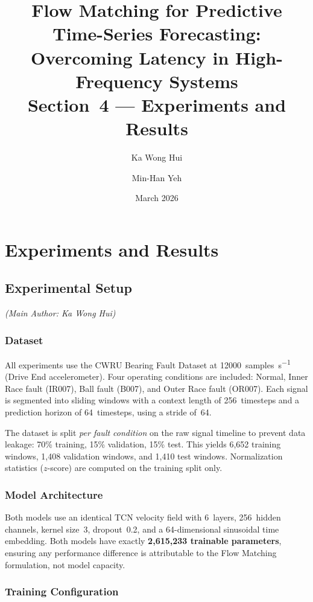 \documentclass[11pt,a4paper]{article}
\title{%
    \textbf{Flow Matching for Predictive Time-Series Forecasting:}\\[4pt]
    \Large Overcoming Latency in High-Frequency Systems\\[12pt]
    \large Section~4 --- Experiments and Results
}
\author{
    Ka Wong Hui \and Min-Han Yeh
}
\date{March 2026}
\begin{document}
\maketitle

\section{Experiments and Results}

\subsection{Experimental Setup}
\label{sec:setup}
\textit{(Main Author: Ka Wong Hui)}

\subsubsection{Dataset}

All experiments use the CWRU Bearing Fault Dataset at
\SI{12000}{samples\per\second} (Drive End accelerometer).
Four operating conditions are included: Normal, Inner Race fault (IR007),
Ball fault (B007), and Outer Race fault (OR007).
Each signal is segmented into sliding windows with a context length of
256~timesteps and a prediction horizon of 64~timesteps, using a stride of~64.

The dataset is split \emph{per fault condition} on the raw signal timeline to
prevent data leakage: 70\% training, 15\% validation, 15\% test.
This yields 6{,}652 training windows, 1{,}408 validation windows, and
1{,}410 test windows.
Normalization statistics ($z$-score) are computed on the training split only.

\subsubsection{Model Architecture}

Both models use an identical TCN velocity field with 6~layers,
256~hidden channels, kernel size~3, dropout~0.2, and a 64-dimensional
sinusoidal time embedding.
Both models have exactly \textbf{2{,}615{,}233 trainable parameters},
ensuring any performance difference is attributable to the Flow Matching
formulation, not model capacity.

\subsubsection{Training Configuration}
\end{document}
